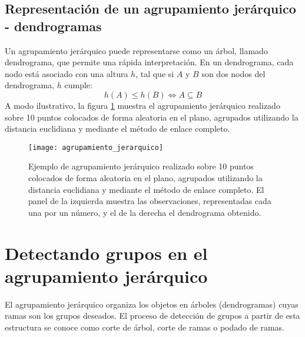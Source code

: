 \subsection{Representación de un agrupamiento jerárquico - dendrogramas}
Un agrupamiento jerárquico puede representarse como un árbol, llamado dendrograma, que permite una rápida interpretación. En un dendrograma, cada nodo está asociado con una altura $h$, tal que si $A$ y $B$ son dos nodos del dendrograma, $h$ cumple:
\begin{equation}
	h(A) \leq h(B) \Leftrightarrow A \subseteq B
\end{equation}
A modo ilustrativo, la figura \ref{fig:agrupamiento_jerarquico} muestra el agrupamiento jerárquico realizado sobre 10 puntos colocados de forma aleatoria en el plano, agrupados utilizando la distancia euclidiana y mediante el método de  enlace completo.
\begin{figure}[h]
    \centering
    \texttt{[image: agrupamiento\_jerarquico]}
    \caption{Ejemplo de agrupamiento jerárquico realizado sobre 10 puntos colocados de forma aleatoria en el plano, agrupados utilizando la distancia euclidiana y mediante el método de enlace completo. El panel de la izquierda muestra las observaciones, representadas cada una por un número, y el de la derecha el dendrograma obtenido.}
    \label{fig:agrupamiento_jerarquico}
\end{figure}
\section{Detectando grupos en el agrupamiento jerárquico}
\label{sec:grupos_en_agrupamiento_jerarquico}
El agrupamiento jerárquico organiza los objetos en árboles (dendrogramas) cuyas ramas son los grupos deseados. El proceso de detección de grupos a partir de esta estructura se conoce como corte de árbol, corte de ramas o podado de ramas. 
